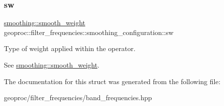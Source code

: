 \subsubsection{\texorpdfstring{sw}{sw}}
{\footnotesize\ttfamily \hyperlink{namespacegeoproc_1_1smoothing_a76e43f405426c150569712512de58028}{smoothing\+::smooth\+\_\+weight} geoproc\+::filter\+\_\+frequencies\+::smoothing\+\_\+configuration\+::sw}



Type of weight applied within the operator. 

See \hyperlink{namespacegeoproc_1_1smoothing_a76e43f405426c150569712512de58028}{smoothing\+::smooth\+\_\+weight}. 

The documentation for this struct was generated from the following file\+:\begin{DoxyCompactItemize}
\item 
geoproc/filter\+\_\+frequencies/band\+\_\+frequencies.\+hpp\end{DoxyCompactItemize}
